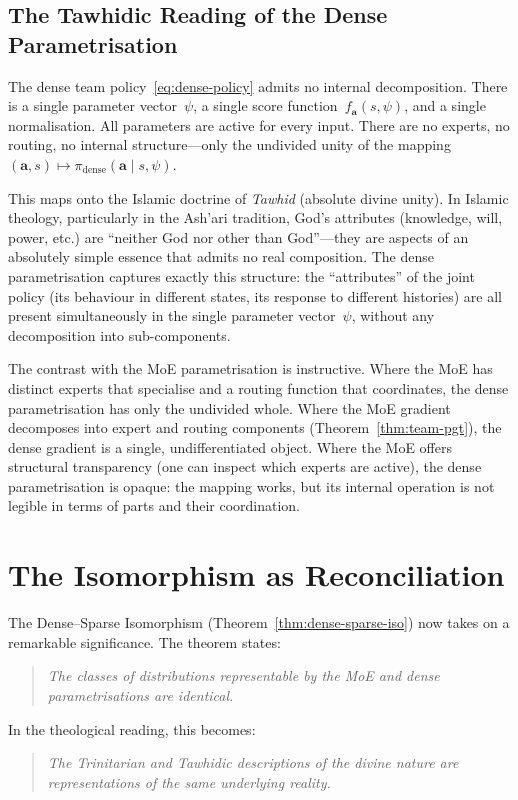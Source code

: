 \subsection{The Tawhidic Reading of the Dense Parametrisation}
\label{subsec:tawhid-dense}

The dense team policy~\eqref{eq:dense-policy} admits no internal decomposition. There is a single parameter vector~$\psi$, a single score function~$f_{\bm{a}}(s,\psi)$, and a single normalisation. All parameters are active for every input. There are no experts, no routing, no internal structure---only the undivided unity of the mapping $(\bm{a},s)\mapsto\pi_{\mathrm{dense}}(\bm{a}\mid s,\psi)$.

This maps onto the Islamic doctrine of \emph{Tawhid} (absolute divine unity). In Islamic theology, particularly in the Ash'ari tradition, God's attributes (knowledge, will, power, etc.) are ``neither God nor other than God''---they are aspects of an absolutely simple essence that admits no real composition. The dense parametrisation captures exactly this structure: the ``attributes'' of the joint policy (its behaviour in different states, its response to different histories) are all present simultaneously in the single parameter vector~$\psi$, without any decomposition into sub-components.

The contrast with the MoE parametrisation is instructive. Where the MoE has distinct experts that specialise and a routing function that coordinates, the dense parametrisation has only the undivided whole. Where the MoE gradient decomposes into expert and routing components (Theorem~\ref{thm:team-pgt}), the dense gradient is a single, undifferentiated object. Where the MoE offers structural transparency (one can inspect which experts are active), the dense parametrisation is opaque: the mapping works, but its internal operation is not legible in terms of parts and their coordination.

\section{The Isomorphism as Reconciliation}
\label{sec:iso-reconciliation}

The Dense--Sparse Isomorphism (Theorem~\ref{thm:dense-sparse-iso}) now takes on a remarkable significance. The theorem states:
\begin{quote}
\emph{The classes of distributions representable by the MoE and dense parametrisations are identical.}
\end{quote}
In the theological reading, this becomes:
\begin{quote}
\emph{The Trinitarian and Tawhidic descriptions of the divine nature are representations of the same underlying reality.}
\end{quote}

